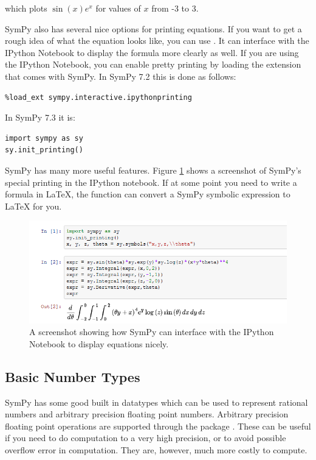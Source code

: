 which plots $\sin(x)e^x$ for values of $x$ from -3 to 3.

SymPy also has several nice options for printing equations.
If you want to get a rough idea of what the equation looks like, you can use .
It can interface with the IPython Notebook to display the formula more clearly as well.
If you are using the IPython Notebook, you can enable pretty printing by loading the extension that comes with SymPy.
In SymPy 7.2 this is done as follows:

\begin{lstlisting}
%load_ext sympy.interactive.ipythonprinting
\end{lstlisting}

In SymPy 7.3 it is:

\begin{lstlisting}
import sympy as sy
sy.init_printing()
\end{lstlisting}

SymPy has many more useful features.
Figure \ref{sympy:pretty_printing} shows a screenshot of SymPy's special printing in the IPython notebook.
If at some point you need to write a formula in \LaTeX, the function  can convert a SymPy symbolic expression to \LaTeX{} for you.

\begin{figure}[H]
\includegraphics[width=\textwidth]{pretty_printing.png}
\caption{A screenshot showing how SymPy can interface with the IPython Notebook to display equations nicely.}
\label{sympy:pretty_printing}
\end{figure}

\subsection*{Basic Number Types}
SymPy has some good built in datatypes which can be used to represent rational numbers and arbitrary precision floating point numbers.
Arbitrary precision floating point operations are supported through the package .
These can be useful if you need to do computation to a very high precision, or to avoid possible overflow error in computation.
They are, however, much more costly to compute.

